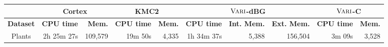 
    \begin{table*}

      \small
   \centering
   \begin{tabular}{|c|r|r|r|r|r|r|r|r|r|}

     \hline
      	\multicolumn{1}{|l}{}
   	& \multicolumn{2}{|c|}{{\sc Cortex}}	
	& \multicolumn{2}{|c|}{KMC2} 
	& \multicolumn{3}{|c|}{$\mbox{\rm {\sc Vari}}$-dBG} 
	& \multicolumn{2}{|c|}{$\mbox{\rm {\sc Vari}}$-C}  \\
        \hline
            {\bf Dataset} & {\bf CPU time} & {\bf Mem.} & {\bf CPU time} & {\bf Mem.} &{\bf CPU time} & {\bf Int. Mem.} & {\bf Ext. Mem.} & {\bf CPU time} & {\bf Mem.}  \\
            \hline
            Plants & 2h 25m 27s & 109,579 &  19m 50s & 4,335 & 1h 34m 37s & 5,388 & 156,504 & 3m 09s & 3,528 \\
    


\end{tabular}
\end{table*}
